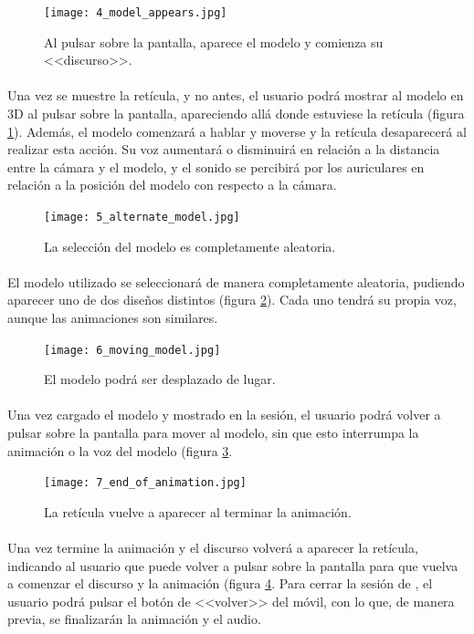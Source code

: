 \documentclass{subfiles}
\begin{document}
\begin{figure}[H]
\centering
\texttt{[image: 4\_model\_appears.jpg]}
\caption{Al pulsar sobre la pantalla, aparece el modelo y comienza su <<discurso>>.}
\label{fig:4_model_appears}
\end{figure}

        \paragraph{}
        Una vez se muestre la retícula, y no antes, el usuario podrá mostrar al modelo en 3D al pulsar sobre la pantalla, apareciendo allá donde estuviese la retícula (figura \ref{fig:4_model_appears}). Además, el modelo comenzará a hablar y moverse y la retícula desaparecerá al realizar esta acción. Su voz aumentará o disminuirá en relación a la distancia entre la cámara y el modelo, y el sonido se percibirá por los auriculares en relación a la posición del modelo con respecto a la cámara.

\begin{figure}[H]
\centering
\texttt{[image: 5\_alternate\_model.jpg]}
\caption{La selección del modelo es completamente aleatoria.}
\label{fig:5_alternate_model}
\end{figure}

        \paragraph{}
        El modelo utilizado se seleccionará de manera completamente aleatoria, pudiendo aparecer uno de dos diseños distintos (figura \ref{fig:5_alternate_model}). Cada uno tendrá su propia voz, aunque las animaciones son similares.

\begin{figure}[H]
\centering
\texttt{[image: 6\_moving\_model.jpg]}
\caption{El modelo podrá ser desplazado de lugar.}
\label{fig:6_moving_model}
\end{figure}

        \paragraph{}
        Una vez cargado el modelo y mostrado en la sesión, el usuario podrá volver a pulsar sobre la pantalla para mover al modelo, sin que esto interrumpa la animación o la voz del modelo (figura \ref{fig:6_moving_model}.

\begin{figure}[H]
\centering
\texttt{[image: 7\_end\_of\_animation.jpg]}
\caption{La retícula vuelve a aparecer al terminar la animación.}
\label{fig:7_end_of_animation}
\end{figure}

        \paragraph{}
        Una vez termine la animación y el discurso volverá a aparecer la retícula, indicando al usuario que puede volver a pulsar sobre la pantalla para que vuelva a comenzar el discurso y la animación (figura \ref{fig:7_end_of_animation}. Para cerrar la sesión de \ra, el usuario podrá pulsar el botón de <<volver>> del móvil, con lo que, de manera previa, se finalizarán la animación y el audio.
\end{document}

